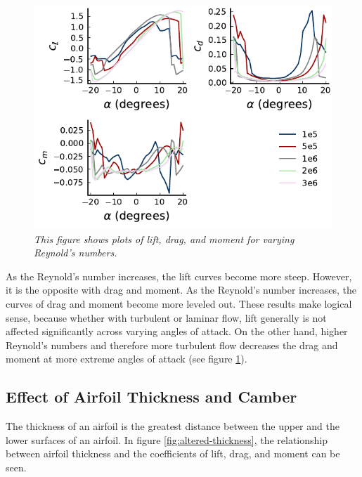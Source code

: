 \documentclass{journal}
\begin{document}
	\begin{figure}[H]
		\centering
		\includegraphics{../graphics/altered-reynolds.pdf}
		\caption{\emph{This figure shows plots of lift, drag, and moment for varying Reynold's numbers.}}
		\label{fig:altered-reynolds}
	\end{figure}
	
	As the Reynold's number increases, the lift curves become more steep. However, it is the opposite with drag and moment. As the Reynold's number increases, the curves of drag and moment become more leveled out. These results make logical sense, because whether with turbulent or laminar flow, lift generally is not affected significantly across varying angles of attack. On the other hand, higher Reynold's numbers and therefore more turbulent flow decreases the drag and moment at more extreme angles of attack (see figure \ref{fig:altered-reynolds}).\\
	
	\subsection{Effect of Airfoil Thickness and Camber}
	The thickness of an airfoil is the greatest distance between the upper and the lower surfaces of an airfoil. In figure \ref{fig:altered-thickness}, the relationship between airfoil thickness and the coefficients of lift, drag, and moment can be seen.\\
	
\end{document}
